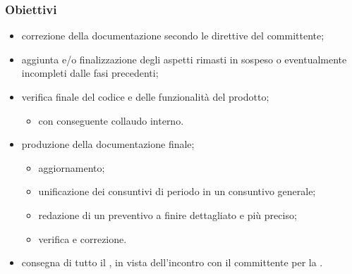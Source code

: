         \subsubsection{Obiettivi}
        \begin{itemize}
            \item correzione della documentazione secondo le direttive del committente;
            \item aggiunta e/o finalizzazione degli aspetti rimasti in sospeso o eventualmente incompleti dalle fasi precedenti;
            \item verifica finale del codice e delle funzionalità del prodotto;
            \begin{itemize}
                \item con conseguente collaudo interno.
            \end{itemize}
            \item produzione della documentazione finale;
            \begin{itemize}
                \item aggiornamento;
                \item unificazione dei consuntivi di periodo in un consuntivo generale;
                \item redazione di un preventivo a finire dettagliato e più preciso;
                \item verifica e correzione.
            \end{itemize}
            \item consegna di tutto il , in vista dell'incontro con il committente per la \RA{}.
        \end{itemize}